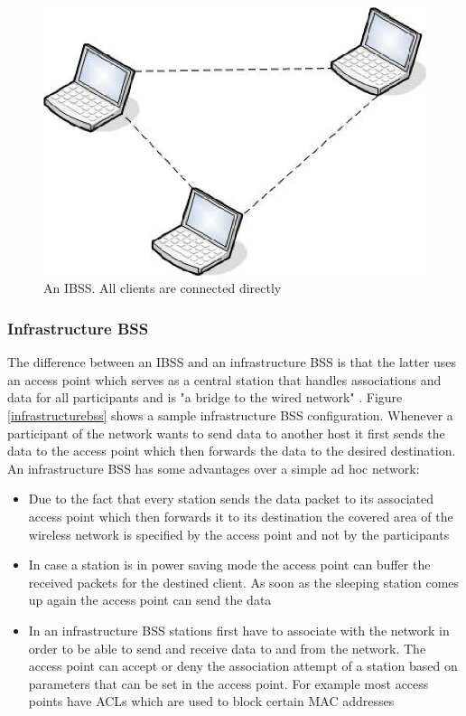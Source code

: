 \begin{figure}[htbp]
	\begin{center}
		\includegraphics[width=0.5\columnwidth]{graphics/IBSS}
	\end{center}
	\vspace{-1em}
	\caption{An IBSS. All clients are connected directly}
	\label{ibss}
\end{figure}

\subsubsection{Infrastructure BSS}

The difference between an IBSS and an infrastructure BSS is that the latter uses an access point which serves as a central station that handles associations and data for all participants and is "a bridge to the wired network" \cite[p.5]{wildpacket}. Figure \ref{infrastructurebss} shows a sample infrastructure BSS configuration. Whenever a participant of the network wants to send data to another host it first sends the data to the access point which then forwards the data to the desired destination. An infrastructure BSS has some advantages over a simple ad hoc network:

\begin{itemize}
    \item Due to the fact that every station sends the data packet to its associated access point which then forwards it to its destination the covered area of the wireless network is specified by 
		the access point and not by the participants
	\item In case a station is in power saving mode the access point can 
		buffer the received packets for the destined client. As soon as the sleeping station comes up again the access point can send the data
	\item In an infrastructure BSS stations first have to associate with the 
		network in order to be able to send and receive data to and from the network. 
		The access point can accept or deny the association attempt of a station 
		based on parameters that can be set in the access point. For example 
		most access points have ACLs which are used to block certain \ac{MAC address}es
\end{itemize}

